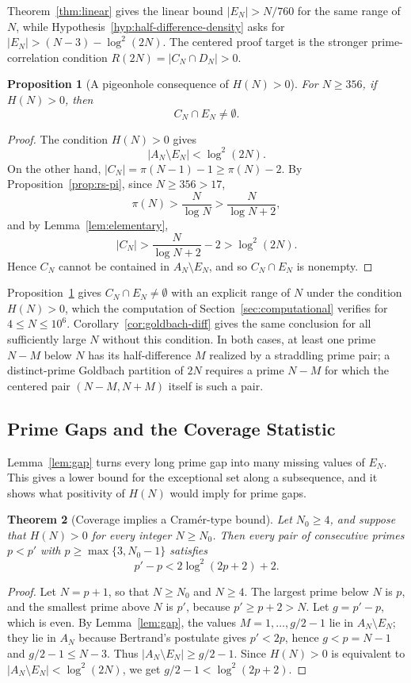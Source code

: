 \documentclass[11pt]{amsart}
\newtheorem{Theorem}{Theorem}[section]
\newtheorem{Proposition}[Theorem]{Proposition}
\theoremstyle{definition}
\theoremstyle{remark}
\begin{document}
Theorem~\ref{thm:linear} gives the linear bound $|E_N|>N/760$ for the same range of $N$, while Hypothesis~\ref{hyp:half-difference-density} asks for $|E_N|>(N-3)-\log^2(2N)$. The centered proof target is the stronger prime-correlation condition $R(2N)=|C_N\cap D_N|>0$.

\begin{Proposition}[A pigeonhole consequence of $H(N)>0$]\label{prop:pigeonhole-CE}
For $N\geq 356$, if $H(N)>0$, then
\[
C_N\cap E_N\neq\emptyset.
\]
\end{Proposition}
\begin{proof}
The condition $H(N)>0$ gives
\[
|A_N\setminus E_N|<\log^2(2N).
\]
On the other hand, $|C_N|=\pi(N-1)-1\geq \pi(N)-2$. By Proposition~\ref{prop:rs-pi}, since $N\geq 356>17$,
\[
\pi(N)>\frac{N}{\log N}>\frac{N}{\log N+2},
\]
and by Lemma~\ref{lem:elementary},
\[
|C_N|>\frac{N}{\log N+2}-2>\log^2(2N).
\]
Hence $C_N$ cannot be contained in $A_N\setminus E_N$, and so $C_N\cap E_N$ is nonempty.
\end{proof}

Proposition~\ref{prop:pigeonhole-CE} gives $C_N\cap E_N\neq\emptyset$ with an explicit range of $N$ under the condition $H(N)>0$, which the computation of Section~\ref{sec:computational} verifies for $4\leq N\leq 10^6$. Corollary~\ref{cor:goldbach-diff} gives the same conclusion for all sufficiently large $N$ without this condition. In both cases, at least one prime $N-M$ below $N$ has its half-difference $M$ realized by a straddling prime pair; a distinct-prime Goldbach partition of $2N$ requires a prime $N-M$ for which the centered pair $(N-M,N+M)$ itself is such a pair.

\subsection{Prime Gaps and the Coverage Statistic}\label{subsec:gaps-H}
Lemma~\ref{lem:gap} turns every long prime gap into many missing values of $E_N$. This gives a lower bound for the exceptional set along a subsequence, and it shows what positivity of $H(N)$ would imply for prime gaps.

\begin{Theorem}[Coverage implies a Cram\'er-type bound]\label{thm:cramer}
Let $N_0\geq 4$, and suppose that $H(N)>0$ for every integer $N\geq N_0$. Then every pair of consecutive primes $p<p'$ with $p\geq \max\{3,N_0-1\}$ satisfies
\[
p'-p<2\log^2(2p+2)+2.
\]
\end{Theorem}
\begin{proof}
Let $N=p+1$, so that $N\geq N_0$ and $N\geq 4$. The largest prime below $N$ is $p$, and the smallest prime above $N$ is $p'$, because $p'\geq p+2>N$. Let $g=p'-p$, which is even. By Lemma~\ref{lem:gap}, the values $M=1,\ldots,g/2-1$ lie in $A_N\setminus E_N$; they lie in $A_N$ because Bertrand's postulate gives $p'<2p$, hence $g<p=N-1$ and $g/2-1\leq N-3$. Thus $|A_N\setminus E_N|\geq g/2-1$. Since $H(N)>0$ is equivalent to $|A_N\setminus E_N|<\log^2(2N)$, we get $g/2-1<\log^2(2p+2)$.
\end{proof}
\end{document}
